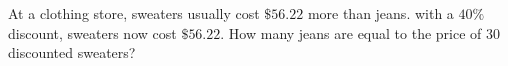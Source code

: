 At a clothing store, sweaters usually cost $\$56.22$  more than jeans. with a $40\%$ discount, sweaters now cost $\$56.22$. How many jeans are equal to the price of $30$ discounted sweaters?
